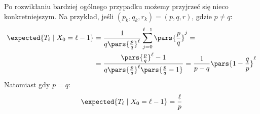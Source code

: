 \begin{example}
	Po rozwikłaniu bardziej ogólnego przypadku możemy przyjrzeć się nieco konkretniejszym. Na przykład, jeśli \((p_k, q_k, r_k) = (p, q, r)\), gdzie \(p \neq q\):
	\begin{align*}
		\expected{T_\ell \mid X_0 = \ell - 1} & = \frac{1}{q\pars{\frac{p}{q}}^\ell}\sum_{j=0}^{\ell-1}\pars{\frac{p}{q}}^j =                                                  \\
		                                      & = \frac{\pars{\frac{p}{q}}^\ell - 1}{q\pars{\frac{p}{q}}^\ell \pars{\frac{p}{q}-1}} = \frac{1}{p-q}\pars{1 - \frac{q}{p}}^\ell
	\end{align*}
	Natomiast gdy \(p=q\):
	\begin{align*}
		\expected{T_\ell \mid X_0 = \ell - 1} = \frac{\ell}{p}
	\end{align*}
\end{example}